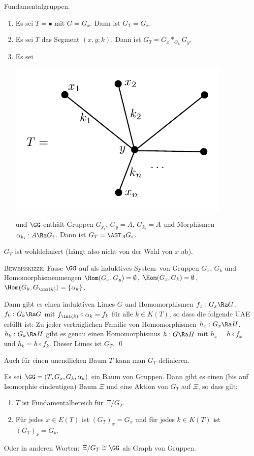\BSP Fundamentalgruppen.
\begin{enumerate}
\item Es sei $T=\bullet$ mit $G=G_x$. Dann ist $G_T=G_x$.
\item Es sei $T$ das Segment $(x,y;k)$.
Dann ist $G_T=G_x *_{G_k} G_y$.
\item Es sei
\begin{center}
	\includegraphics{grugraImages/GT1}
\end{center}
und $\GG$ enthält Gruppen $G_{x_i}$, $G_y=A$, $G_{k_i}=A$ und
Morphismen $\alpha_{k_i}:A\Ra G_i$.
Dann ist $G_T = \AST_A G_i$.
\end{enumerate}

\BEM $G_T$ ist wohldefiniert (hängt also nicht von der Wahl von
$x$ ab).

\textsc{Beweisskizze:} Fasse $\GG$ auf als \glqq induktives
System\grqq\
von Gruppen $G_x$, $G_k$ und Homomorphismenmengen $\Hom(G_x,G_y)=\emptyset$,
$\Hom(G_x,G_k)=\emptyset$, $\Hom(G_k,G_{\ini(k)})=\{\alpha_k\}$.

Dann gibt es einen induktiven Limes $G$ und Homomorphismen
$f_x:G_x\Ra G$, $f_k:G_k\Ra G$ mit
$f_{\ini(k)}\circ \alpha_k = f_k$ für alle $k\in K(T)$, so dass
die folgende UAE erfüllt ist: Zu jeder verträglichen Familie
von Homomorphismen $h_x:G_x\Ra H$, $h_k:G_k\Ra H$ gibt es genau einen
Homomorphismus $h:G\Ra H$ mit $h_x=h\circ f_x$ und $h_k=h\circ f_k$.
Dieser Limes ist $G_T$.
\qed

\FOLG Auch für einen unendlichen Baum $T$ kann man $G_T$ definieren.

\PROP\label{prop_BvG}
Es sei $\GG=(T,G_x,G_k,\alpha_k)$ ein Baum von Gruppen.
Dann gibt es einen (bis auf Isomorphie eindeutigen) Baum $\Xi$
und eine Aktion von $G_T$ auf $\Xi$, so dass gilt:
\begin{enumerate}
\item $T$ ist Fundamentalbereich für $\Xi/G_T$.
\item Für jedes $x\in E(T)$ ist $(G_T)_x = G_x$ und für jedes
$k\in K(T)$ ist $(G_T)_k = G_k$.
\end{enumerate}
Oder in anderen Worten: $\Xi/G_T \cong \GG$ als Graph von Gruppen.

